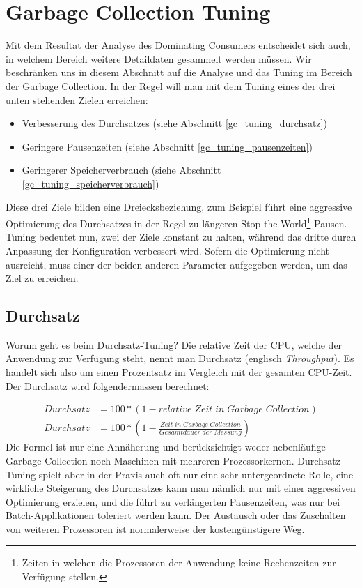 \section{Garbage Collection Tuning}\label{garbage_collection_tuning}
Mit dem Resultat der Analyse des Dominating Consumers entscheidet sich auch, in welchem Bereich weitere Detaildaten gesammelt werden müssen. Wir beschränken uns in diesem Abschnitt auf die Analyse und das Tuning im Bereich der Garbage Collection. In der Regel will man mit dem Tuning eines der drei unten stehenden Zielen erreichen\cite{langerkreftJavaCore}: 
\begin{itemize}
\item Verbesserung des Durchsatzes (siehe Abschnitt \ref{gc_tuning_durchsatz})
\item Geringere Pausenzeiten (siehe Abschnitt \ref{gc_tuning_pausenzeiten})
\item Geringerer Speicherverbrauch (siehe Abschnitt \ref{gc_tuning_speicherverbrauch})
\end{itemize}

Diese drei Ziele bilden eine Dreiecksbeziehung, zum Beispiel führt eine aggressive Optimierung des Durchsatzes in der Regel zu längeren Stop-the-World\footnote{Zeiten in welchen die Prozessoren der Anwendung keine Rechenzeiten zur Verfügung stellen.} Pausen. Tuning bedeutet nun, zwei der Ziele konstant zu halten, während das dritte durch Anpassung der Konfiguration verbessert wird. Sofern die Optimierung nicht ausreicht, muss einer der beiden anderen Parameter aufgegeben werden, um das Ziel zu erreichen.


\subsection{Durchsatz\label{gc_tuning_durchsatz}}
Worum geht es beim Durchsatz-Tuning? Die relative Zeit der CPU, welche der Anwendung zur Verfügung steht, nennt man Durchsatz (englisch \textit{Throughput}). Es handelt sich also um einen Prozentsatz im Vergleich mit der gesamten CPU-Zeit. Der Durchsatz wird folgendermassen berechnet:

 \begin{align*}
         Durchsatz &= 100 * (1-relative\;Zeit\;in\;Garbage\;Collection)\\
         Durchsatz &= 100 * (1-\frac{Zeit\;in\;Garbage\;Collection}{Gesamtdauer\;der\;Messung})
 \end{align*}
Die Formel ist nur eine Annäherung und berücksichtigt weder nebenläufige Garbage Collection noch Maschinen mit mehreren Prozessorkernen. Durchsatz-Tuning spielt aber in der Praxis auch oft nur eine sehr untergeordnete Rolle\cite{langerkreftJavaCore}, eine wirkliche Steigerung des Durchsatzes kann man nämlich nur mit einer aggressiven Optimierung erzielen, und die führt zu verlängerten Pausenzeiten, was nur bei Batch-Applikationen toleriert werden kann. Der Austausch oder das Zuschalten von weiteren Prozessoren ist normalerweise der kostengünstigere Weg.

